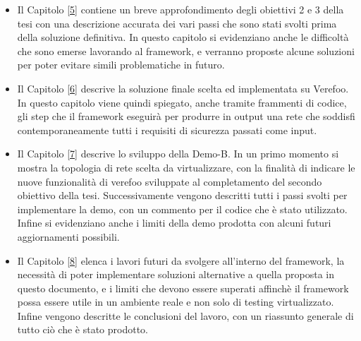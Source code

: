\begin{itemize}
    \item Il Capitolo \hyperref[ch:intro]{[5]} contiene un breve approfondimento degli obiettivi 2 e 3 della tesi con una descrizione accurata dei vari passi che sono stati svolti prima della soluzione definitiva.
          In questo capitolo si evidenziano anche le difficoltà che sono emerse lavorando al framework, e verranno proposte alcune soluzioni per poter evitare simili problematiche in futuro.
    \item Il Capitolo \hyperref[ch:intro]{[6]} descrive la soluzione finale scelta ed implementata su Verefoo. In questo capitolo viene quindi spiegato, anche tramite frammenti di codice, gli step
          che il framework eseguirà per produrre in output una rete che soddisfi contemporaneamente tutti i requisiti di sicurezza passati come input. 
    \item Il Capitolo \hyperref[ch:intro]{[7]} descrive lo sviluppo della Demo-B. In un primo momento si mostra la topologia
        di rete scelta da virtualizzare, con la finalità di indicare le nuove funzionalità di verefoo sviluppate al completamento del secondo obiettivo della tesi. Successivamente vengono descritti tutti i passi svolti per implementare la demo, con un commento per il codice che è stato utilizzato. Infine
        si evidenziano anche i limiti della demo prodotta con alcuni  futuri aggiornamenti possibili.
    \item Il Capitolo \hyperref[ch:conclusions]{[8]} elenca i lavori futuri da svolgere all'interno del framework, la necessità di poter implementare soluzioni
          alternative a quella proposta in questo documento, e i limiti che devono essere superati affinchè il framework possa essere utile in un ambiente reale e non
          solo di testing virtualizzato. Infine vengono descritte le conclusioni del lavoro, con un riassunto generale di tutto ciò che è stato prodotto.
\end{itemize}